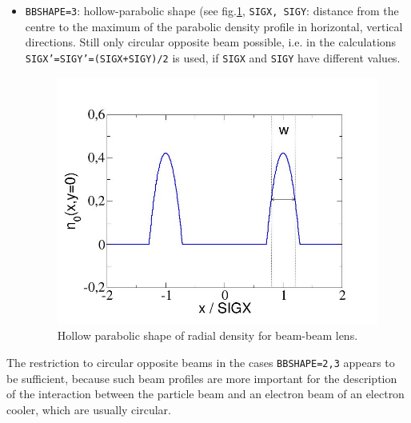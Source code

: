{\begin{madlist}
\begin{itemize}
       \item  {\tt BBSHAPE=3}: hollow-parabolic shape (see
       fig.\ref{fig:beambeam_n_hollowparabol}, {\tt SIGX, SIGY}: distance 
       from the centre to the maximum of the parabolic density profile in 
       horizontal, vertical directions. Still only circular opposite beam 
       possible, i.e. in the calculations {\tt SIGX'=SIGY'=(SIGX+SIGY)/2} is 
       used, if {\tt SIGX} and {\tt SIGY} have different values.

\begin{figure}[h]
  \begin{center}
    \flushright
    \includegraphics[width=420px]{jpg/beambeam_n_hollowparabol.jpg}
    \caption{Hollow parabolic shape of radial density for beam-beam lens.} 
    \label{fig:beambeam_n_hollowparabol}
  \end{center}
\end{figure}

     \end{itemize}
     
     The restriction to circular opposite beams in the cases {\tt BBSHAPE=2,3}
     appears to be sufficient, because such beam profiles are more important 
     for the description of the interaction between the particle beam and 
     an electron beam of an electron cooler, which are usually circular. 
     

\end{madlist}}
